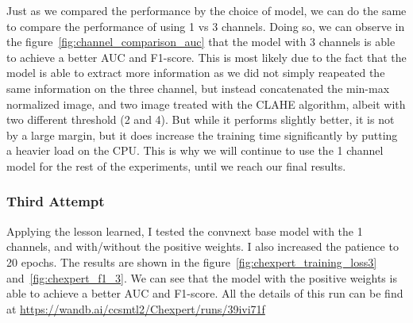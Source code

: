 \documentclass[11pt]{article}
\begin{document}
                Just as we compared the performance by the choice of model, we can do the same to compare the performance of using 1 vs 3 channels. Doing so, we can observe
                in the figure~\ref{fig:channel_comparison_auc} that the model with 3 channels is able to achieve a better AUC and F1-score. This is most likely due to the fact that the model is able to
                extract more information as we did not simply reapeated the same information on the three channel, but instead concatenated the min-max normalized image, and two image treated
                with the CLAHE algorithm, albeit with two different threshold (2 and 4). But while it performs slightly better, it is not by a large margin, but it does increase the training time significantly
                by putting a heavier load on the CPU. This is why we will continue to use the 1 channel model for the rest of the experiments, until we reach our final results.

            \subsubsection{Third Attempt}
            Applying the lesson learned, I tested the convnext base model with the 1 channels, and with/without the positive weights. I also increased the patience to 20 epochs.
            The results are shown in the figure~\ref{fig:chexpert_training_loss3} and~\ref{fig:chexpert_f1_3}. We can see that the model with the positive weights is able to achieve a better AUC and F1-score.
            All the details of this run can be find at \url{https://wandb.ai/ccsmtl2/Chexpert/runs/39ivi71f}
\end{document}
